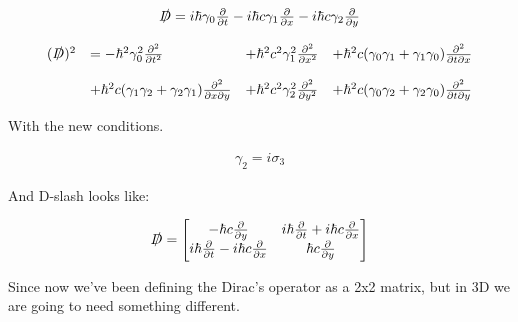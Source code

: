 \begin{equation}
  \begin{array}{c}
  \slashed{D} = i\hbar\gamma_0 \frac{\partial}{\partial t} - i\hbar c \gamma_1 \frac{\partial}{\partial x} - i\hbar c\gamma_2 \frac{\partial}{\partial y}
  \\

  \\
  \begin{array}{llll}
    (\slashed{D})^2 &= -\hbar^2 \gamma_0^2 \frac{\partial^2}{\partial t^2} &+ \hbar^2 c^2 \gamma_1^2 \frac{\partial^2}{\partial x^2} &+ \hbar^2 c (\gamma_0\gamma_1 + \gamma_1\gamma_0)\frac{\partial^2}{\partial t \partial x}
    \\

    \\
                    &+ \hbar^2 c (\gamma_1\gamma_2 + \gamma_2\gamma_1)\frac{\partial^2}{\partial x \partial y}  &+\hbar^2 c^2 \gamma_2^2 \frac{\partial^2}{\partial y^2}  &+ \hbar^2 c (\gamma_0\gamma_2 + \gamma_2\gamma_0)\frac{\partial^2}{\partial t \partial y}
  \end{array}
\end{array}
\end{equation}

With the new conditions.

\begin{equation}
\begin{array}{c}
  \gamma_2 =i\sigma_3
\end{array}
\end{equation}

And D-slash looks like:

\begin{equation}
  \begin{array}{c}
    \slashed{D} = \begin{bmatrix}
      -\hbar c \frac{\partial}{\partial y} &  i\hbar \frac{\partial}{\partial t}+i\hbar c\frac{\partial}{\partial x} \\
      i\hbar \frac{\partial}{\partial t}-i\hbar c\frac{\partial}{\partial x} & \hbar c \frac{\partial}{\partial y}\end{bmatrix}
  \end{array}
\end{equation}

Since now we've been defining the Dirac's operator as a 2x2 matrix, but in 3D we are going to need something different.

